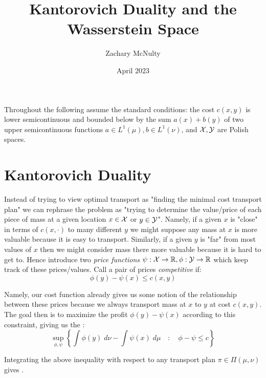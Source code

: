


\title{Kantorovich Duality and the Wasserstein Space}
\author{Zachary McNulty}
\date{April 2023}





\maketitle

\hacross

\noindent Throughout the following assume the standard conditions: the cost $c(x,y)$ is lower semicontinuous and bounded below by the sum $a(x) + b(y)$ of two upper semicontinuous functions $a \in L^1(\mu), b \in L^1(\nu)$, and ${\mathcal X}, {\mathcal Y}$ are Polish spaces.

\section{Kantorovich Duality}



\noindent Instead of trying to view optimal transport as "finding the minimal cost transport plan" we can rephrase the problem as "trying to determine the value/price of each piece of mass at a given location $x \in {\mathcal X}$ or $y \in {\mathcal Y}$". Namely, if a given $x$ is "close" in terms of $c(x, \cdot)$ to many different $y$ we might suppose any mass at $x$ is more valuable because it is easy to transport. Similarly, if a given $y$ is "far" from most values of $x$ then we might consider mass there more valuable because it is hard to get to. Hence introduce two \textit{price functions} $\psi: {\mathcal X} \to \mathbb{R}, \phi: {\mathcal Y} \to \mathbb{R}$ which keep track of these prices/values. Call a pair of prices \textit{competitive} if:
%
\[ \phi(y) - \psi(x) \leq c(x,y)\]

\noindent Namely, our cost function already gives us some notion of the relationship between these prices because we always transport mass at $x$ to $y$ at cost $c(x,y).$ The goal then is to maximize the profit $\phi(y) - \psi(x)$ according to this constraint, giving us the :
%
\begin{equation}
    \sup_{\phi, \psi} \left\{ \int \phi(y) \; d\nu  -\int \psi(x) \; d\mu \quad : \quad \phi - \psi \leq c\right\}
    \label{eqn:kantorovich_duality}
\end{equation}



\noindent Integrating the above inequality with respect to any transport plan $\pi \in \Pi(\mu, \nu)$ gives .

